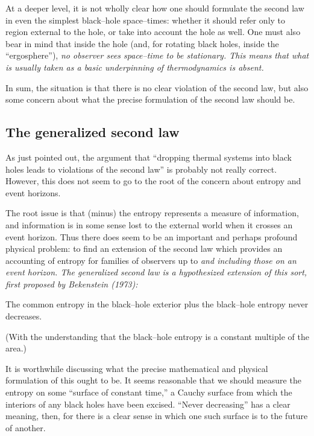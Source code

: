 At a deeper level, it is not wholly clear how one should formulate the second
law in even the simplest black--hole space--times:  whether it should refer
only to region external to the hole, or take into account the hole as well. 
One must also bear in mind that inside the hole (and, for rotating black holes,
inside the ``ergosphere''), \it no \rm observer sees space--time to be
stationary.  This means that what is usually taken as a basic underpinning of
thermodynamics is absent. 

In sum, the situation is that there is no clear violation of the second law,
but also some concern about what the precise formulation of the second law
should be.  

\subsection{The generalized second law}

As just pointed out, the argument that ``dropping thermal systems into black
holes leads to violations of the second law'' is probably not really correct.
However, this does not seem to go to the root of the concern about entropy and
event horizons.

The root issue is that (minus) the  entropy represents a measure of
information, and information is  in some sense lost to the external world when
it crosses an event horizon.  Thus there does seem to be an important and
perhaps profound physical problem:  to find an extension of the second law
which provides an accounting of entropy for families of observers up to \it and
including \rm those on an event horizon.  The \it generalized second law \rm is
a hypothesized extension of this sort, first proposed by Bekenstein (1973):

\itemitem{} The common entropy in the black--hole exterior plus the black--hole
entropy never decreases.

\noindent (With the understanding that the black--hole entropy is a constant
multiple of the area.)  

It is worthwhile discussing what the precise mathematical and physical
formulation of this ought to be. It seems reasonable that we should measure the
entropy on some ``surface of constant time,'' a Cauchy surface from which the
interiors of any black holes have been excised.  ``Never decreasing'' has a
clear meaning, then, for there is a clear sense in which one such surface is to
the future of another.  

